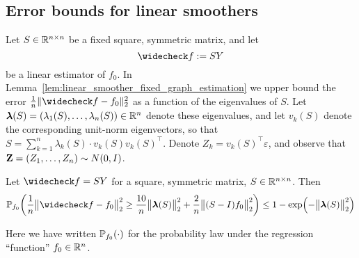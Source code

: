 \subsection{Error bounds for linear smoothers}

Let $S \in \mathbb{R}^{n \times n}$ be a fixed square, symmetric matrix, and let 
\begin{equation*}
\wc{f} := SY
\end{equation*}
be a linear estimator of $f_0$. In  Lemma~\ref{lem:linear_smoother_fixed_graph_estimation} we upper bound the error $\frac{1}{n}\|\wc{f} - f_0\|_2^2$ as a function of the eigenvalues of $S$. Let $\boldsymbol{\lambda}(S) = (\lambda_1(S),\ldots,\lambda_n(S)) \in \mathbb{R}^n$ denote these eigenvalues, and let $v_k(S)$ denote the corresponding unit-norm eigenvectors, so that $S = \sum_{k = 1}^{n} \lambda_k(S) \cdot v_k(S) v_k(S)^{\top}$. Denote $Z_k = v_k(S)^{\top} \varepsilon$, and observe that ${\bf Z} = (Z_1,\ldots,Z_n) \sim N(0,I)$. 

\begin{lemma}
	\label{lem:linear_smoother_fixed_graph_estimation}
	Let $\wc{f} = SY$ for a square, symmetric matrix, $S \in \mathbb{R}^{n \times n}$. Then
	\begin{equation*}
	\Pbb_{f_0}\biggl(\frac{1}{n}\bigl\|\wc{f} - f_0\bigr\|_2^2 \geq \frac{10}{n} \bigl\|\lambdavec(S)\bigr\|_2^2 + \frac{2}{n}\bigl\|(S - I)f_0\bigr\|_2^2\biggr) \leq 1 - \exp\Bigl(-\bigl\|\lambdavec(S)\bigr\|_2^2\Bigr)
	\end{equation*}
\end{lemma}
Here we have written $\mathbb{P}_{f_0}(\cdot)$ for the probability law under the regression ``function'' $f_0 \in \mathbb{R}^n$. 

